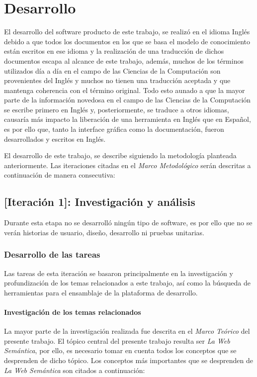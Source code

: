 \chapter{Desarrollo}
\label{chap:desarrollo}

El desarrollo del software producto de este trabajo, se realizó en el idioma Inglés debido a que todos los documentos en los que se basa el modelo de conocimiento están escritos en ese idioma y la realización de una traducción de dichos documentos escapa al alcance de este trabajo, además, muchos de los términos utilizados día a día en el campo de las Ciencias de la Computación son provenientes del Inglés y muchos no tienen una traducción aceptada y que mantenga coherencia con el término original. Todo esto aunado a que la mayor parte de la información novedosa en el campo de las Ciencias de la Computación se escribe primero en Inglés y, posteriormente, se traduce a otros idiomas, causaría más impacto la liberación de una herramienta en Inglés que en Español, es por ello que, tanto la interface gráfica como la documentación, fueron desarrollados y escritos en Inglés.

El desarrollo de este trabajo, se describe siguiendo la metodología planteada anteriormente. Las iteraciones citadas en el \textit{Marco Metodológico} serán descritas a continuación de manera consecutiva:

\section{[Iteración 1]: Investigación y análisis}
Durante esta etapa no se desarrolló ningún tipo de software, es por ello que no se verán historias de usuario, diseño, desarrollo ni pruebas unitarias.

\subsection{Desarrollo de las tareas}
Las tareas de esta iteración se basaron principalmente en la investigación y profundización de los temas relacionados a este trabajo, así como la búsqueda de herramientas para el ensamblaje de la plataforma de desarrollo.

\subsubsection{Investigación de los temas relacionados}
La mayor parte de la investigación realizada fue descrita en el \textit{Marco Teórico} del presente trabajo. El tópico central del presente trabajo resulta ser \textit{La Web Semántica}, por ello, es necesario tomar en cuenta todos los conceptos que se desprenden de dicho tópico. Los conceptos más importantes que se desprenden de \textit{La Web Semántica} son citados a continuación:

